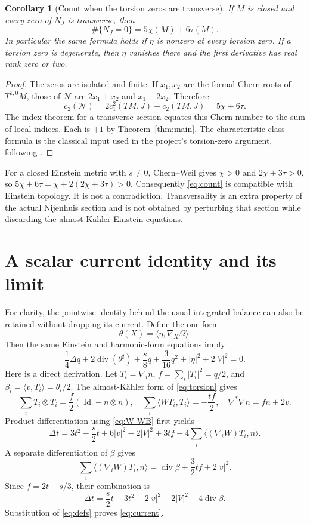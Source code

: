 \documentclass[11pt]{article}
\newtheorem{corollary}[theorem]{Corollary}
\theoremstyle{remark}\newtheorem{remark}[theorem]{Remark}
\newcommand{\diver}{\operatorname{div}}
\newcommand{\Id}{\operatorname{Id}}
\begin{document}
\begin{corollary}[Count when the torsion zeros are transverse]
If $M$ is closed and every zero of $N_J$ is transverse, then
\begin{equation}
 \boxed{\#\{N_J=0\}=5\chi(M)+6\tau(M).}\label{eq:count}
\end{equation}
In particular the same formula holds if $\eta$ is nonzero at every
torsion zero. If a torsion zero is degenerate, then $\eta$ vanishes
there and the first derivative has real rank zero or two.
\end{corollary}
\begin{proof}
The zeros are isolated and finite. If $x_1,x_2$ are the formal Chern
roots of $T^{1,0}M$, those of $\mathcal N$ are
$2x_1+x_2$ and $x_1+2x_2$. Therefore
\[
 c_2(\mathcal N)=2c_1^2(TM,J)+c_2(TM,J)=5\chi+6\tau.
\]
The index theorem for a transverse section equates this Chern number
to the sum of local indices. Each is $+1$ by Theorem~\ref{thm:main}.
The characteristic-class formula is the classical input used in the
project's torsion-zero argument, following \cite{Armstrong}.
\end{proof}

For a closed Einstein metric with $s\ne0$, Chern--Weil gives
$\chi>0$ and $2\chi+3\tau>0$, so
$5\chi+6\tau=\chi+2(2\chi+3\tau)>0$.
Consequently \eqref{eq:count} is compatible with Einstein topology.
It is not a contradiction. Transversality is an extra property of the
actual Nijenhuis section and is not obtained by perturbing that section
while discarding the almost-K\"ahler Einstein equations.

\section{A scalar current identity and its limit}
For clarity, the pointwise identity behind the usual integrated balance
can also be retained without dropping its current. Define the one-form
\[
 \theta(X)=\langle\eta,\nabla_X\Omega\rangle.
\]
Then the same Einstein and harmonic-form equations imply
\begin{equation}
 \boxed{\frac14\Delta q+2\diver(\theta^\sharp)
       +\frac{s}{8}q+\frac{3}{16}q^2+|\eta|^2+2|V|^2=0.}
 \label{eq:current}
\end{equation}
Here is a direct derivation. Let $T_i=\nabla_i n$, $f=\sum_i|T_i|^2=q/2$,
and $\beta_i=\langle v,T_i\rangle=\theta_i/2$.
The almost-K\"ahler form of \eqref{eq:torsion} gives
\[
 \sum_iT_i\otimes T_i=\frac f2(\Id-n\otimes n),\quad
 \sum_i\langle WT_i,T_i\rangle=-\frac{tf}{2},\quad
 \nabla^*\nabla n=fn+2v.
\]
Product differentiation using \eqref{eq:W-WB} first yields
\[
 \Delta t=3t^2-\frac{s}{2}t+6|v|^2-2|V|^2+3tf
            -4\sum_i\langle(\nabla_iW)T_i,n\rangle.
\]
A separate differentiation of $\beta$ gives
\[
 \sum_i\langle(\nabla_iW)T_i,n\rangle
       =\diver\beta+\frac32tf+2|v|^2.
\]
Since $f=2t-s/3$, their combination is
\[
 \Delta t=\frac{s}{2}t-3t^2-2|v|^2-2|V|^2-4\diver\beta.
\]
Substitution of \eqref{eq:defs} proves \eqref{eq:current}.
\end{document}
